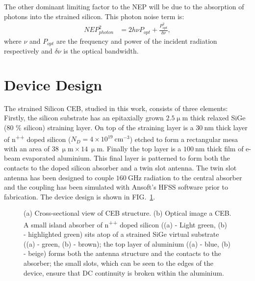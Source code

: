 \documentclass[aip, apl, a4paper, amsmath,amssymb, reprint]{revtex4-1}
\begin{document}
The other dominant limiting factor to the NEP will be due to the absorption of photons into the strained silicon. This photon noise term is:
\begin{align}
NEP^{2}_{photon} &= 2h\nu P_{opt} + \frac{P_{opt}^{2}}{\delta \nu}, \label{eq:photonNEP}
\end{align}
where $\nu$ and $P_{opt}$ are the frequency and power of the incident radiation respectively and $\delta \nu$ is the optical bandwidth.

\section{Device Design} \label{sec:Device}
The strained Silicon CEB, studied in this work, consists of three elements: Firstly, the silicon substrate has an epitaxially grown $2.5\mathrm{\upmu m}$ thick relaxed SiGe (80 \% silicon) straining layer.  On top of the straining layer is a $30~\mathrm{nm}$ thick layer of n\textsuperscript{++} doped silicon ($N_{D} = 4 \times 10^{19}~\mathrm{cm}^{-3}$) etched to form a rectangular mesa with an area of $38~\mathrm{\upmu m} \times 14~\mathrm{\upmu m}$. Finally the top layer is a $100~\mathrm{nm}$ thick film of e-beam evaporated aluminium. This final layer is patterned to form both the contacts to the doped silicon absorber and a twin slot antenna. The twin slot antenna has been designed to couple $160~\mathrm{GHz}$ radiation to the central absorber and the coupling has been simulated with Ansoft's HFSS software prior to fabrication. The device design is shown in FIG.~\ref{fig:design}.
\begin{figure}[ht]
\caption{(a) Cross-sectional view of CEB structure. (b) Optical image a CEB. A small island absorber of n\textsuperscript{++} doped silicon ((a) - Light green, (b) - highlighted green) sits atop of a strained SiGe virtual substrate ((a) - green, (b) - brown); the top layer of aluminium ((a) - blue, (b) - beige) forms both the antenna structure and the contacts to the absorber; the small slots, which can be seen to the edges of the device, ensure that DC continuity is broken within the aluminium.} \label{fig:design}
\end{figure}
\end{document}
